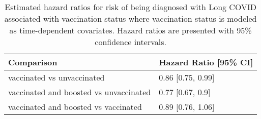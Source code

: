\begin{table}[!htbp]
\centering
\begin{tabular}{ll}
  \hline
Comparison & Hazard Ratio [95\% CI] \\ 
  \hline
vaccinated vs unvaccinated & 0.86 [0.75, 0.99] \\ 
  vaccinated and boosted vs unvaccinated & 0.77 [0.67, 0.9] \\ 
  vaccinated and boosted vs vaccinated & 0.89 [0.76, 1.06] \\ 
   \hline
\end{tabular}
\caption{Estimated hazard ratios for risk of being diagnosed with Long COVID associated with vaccination status where vaccination status is modeled as time-dependent covariates. Hazard ratios are presented with 95\% confidence intervals.} 
\label{tab:cox_time_dep_alt_emm_pairs}
\end{table}
